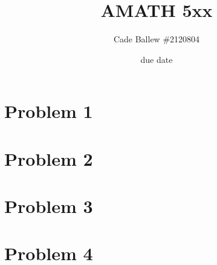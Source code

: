 \documentclass{article}
\title{AMATH 5xx}
\author{Cade Ballew \#2120804}
\date{due date}
\begin{document}
	
\maketitle
	
\section{Problem 1}

\section{Problem 2}

\section{Problem 3}

\section{Problem 4}
\end{document}
